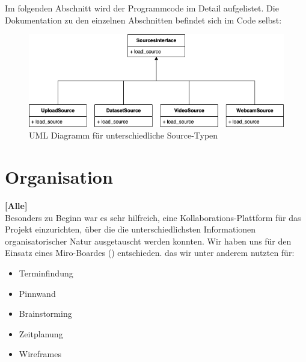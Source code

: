 Im folgenden Abschnitt wird der Programmcode im Detail aufgelistet. Die Dokumentation zu den einzelnen Abschnitten befindet sich im Code selbst: 
\bigbreak



\newpage
\begin{figure}
	\centering
	\includegraphics[scale=0.5]{input_sources.png}
	\caption{UML Diagramm für unterschiedliche Source-Typen}
\end{figure}








\newpage

\section{Organisation}

\textbf{[Alle]} \\

Besonders zu Beginn war es sehr hilfreich, eine Kollaborations-Plattform 
für das Projekt einzurichten, über die die unterschiedlichsten Informationen
organisatorischer Natur ausgetauscht werden konnten. 
Wir haben uns für den Einsatz eines Miro-Boardes () entschieden. das wir 
unter anderem nutzten für:

\begin{itemize}
	\item Terminfindung
	\item Pinnwand
	\item Brainstorming
	\item Zeitplanung
	\item Wireframes
\end{itemize}

